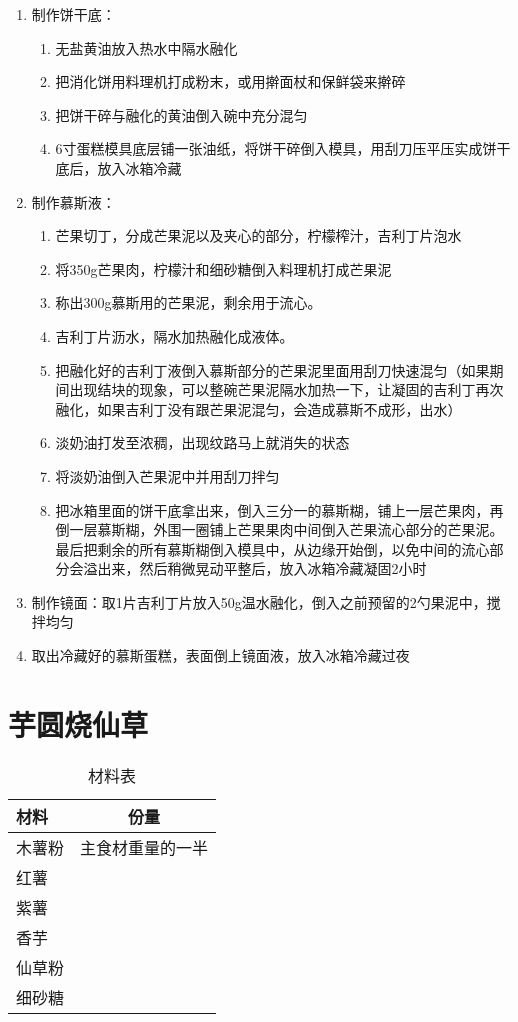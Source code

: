 \begin{enumerate}
    \item 制作饼干底：
    \begin{enumerate}
    \item 无盐黄油放入热水中隔水融化
    \item 把消化饼用料理机打成粉末，或用擀面杖和保鲜袋来擀碎
    \item 把饼干碎与融化的黄油倒入碗中充分混匀
    \item 6寸蛋糕模具底层铺一张油纸，将饼干碎倒入模具，用刮刀压平压实成饼干底后，放入冰箱冷藏
    \end{enumerate}
    \item 制作慕斯液：
    \begin{enumerate}
    \item 芒果切丁，分成芒果泥以及夹心的部分，柠檬榨汁，吉利丁片泡水
    \item 将350g芒果肉，柠檬汁和细砂糖倒入料理机打成芒果泥
    \item 称出300g慕斯用的芒果泥，剩余用于流心。
    \item 吉利丁片沥水，隔水加热融化成液体。
    \item 把融化好的吉利丁液倒入慕斯部分的芒果泥里面用刮刀快速混匀（如果期间出现结块的现象，可以整碗芒果泥隔水加热一下，让凝固的吉利丁再次融化，如果吉利丁没有跟芒果泥混匀，会造成慕斯不成形，出水）
    \item 淡奶油打发至浓稠，出现纹路马上就消失的状态
    \item 将淡奶油倒入芒果泥中并用刮刀拌匀
    \item 把冰箱里面的饼干底拿出来，倒入三分一的慕斯糊，铺上一层芒果肉，再倒一层慕斯糊，外围一圈铺上芒果果肉中间倒入芒果流心部分的芒果泥。最后把剩余的所有慕斯糊倒入模具中，从边缘开始倒，以免中间的流心部分会溢出来，然后稍微晃动平整后，放入冰箱冷藏凝固2小时
    \end{enumerate}
    \item 制作镜面：取1片吉利丁片放入50g温水融化，倒入之前预留的2勺果泥中，搅拌均匀
    \item 取出冷藏好的慕斯蛋糕，表面倒上镜面液，放入冰箱冷藏过夜
\end{enumerate}



\section{芋圆烧仙草}

\begin{table}[H]
    \centering
    \begin{tabular}{|l||c|}\hline
     \textbf{材料}    &  \textbf{份量}\\ \hline\hline
    木薯粉 & 主食材重量的一半 \\ \hline
    红薯 &  \\ \hline
    紫薯 &  \\ \hline
    香芋 & \\ \hline
    仙草粉 & \\ \hline
    细砂糖 & \\ \hline
    \end{tabular}
    \caption{材料表}
\end{table}


